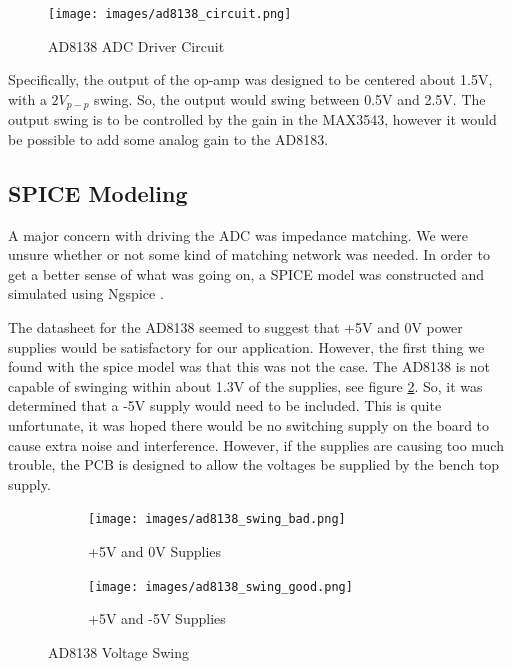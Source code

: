 \documentclass[a4paper, 12pt]{article}
\begin{document}
\begin{figure}[ht]
  \centering
  \caption{AD8138 ADC Driver Circuit}
  \label{fig:ad8138_circuit}
  \texttt{[image: images/ad8138\_circuit.png]}
\end{figure}

Specifically, the output of the op-amp was designed to be centered about 1.5V, with a $2V_{p-p}$ swing.  So, the output would swing between 0.5V and 2.5V.  The output swing is to be controlled by the gain in the MAX3543, however it would be possible to add some analog gain to the AD8183.

\subsection{SPICE Modeling}
A major concern with driving the ADC was impedance matching.  We were unsure whether or not some kind of matching network was needed.  In order to get a better sense of what was going on, a SPICE model was constructed and simulated using Ngspice \cite{ngspice}.

The datasheet for the AD8138 seemed to suggest that +5V and 0V power supplies would be satisfactory for our application.  However, the first thing we found with the spice model was that this was not the case.  The AD8138 is not capable of swinging within about 1.3V of the supplies, see figure \ref{fig:ad8138_swing_bad}.  So, it was determined that a -5V supply would need to be included.  This is quite unfortunate, it was hoped there would be no switching supply on the board to cause extra noise and interference.  However, if the supplies are causing too much trouble, the PCB is designed to allow the voltages be supplied by the bench top supply.

\begin{figure}[ht]
\centering
\begin{subfigure}[b]{0.45\textwidth}
  \texttt{[image: images/ad8138\_swing\_bad.png]}
  \caption{+5V and 0V Supplies}
  \label{fig:ad8138_swing_bad}
\end{subfigure}
\begin{subfigure}[b]{0.45\textwidth}  
  \texttt{[image: images/ad8138\_swing\_good.png]}
  \caption{+5V and -5V Supplies}
  \label{fig:ad8138_swing_good}
\end{subfigure}

\caption{AD8138 Voltage Swing}
\label{fig:ad8138_swing}
\end{figure}
\end{document}

